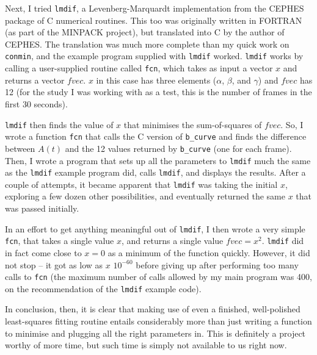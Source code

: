 \documentclass[12pt]{article}
\begin{document}
Next, I tried \verb|lmdif|, a Levenberg-Marquardt implementation from
the CEPHES package of C numerical routines.  This too was originally
written in FORTRAN (as part of the MINPACK project), but translated
into C by the author of CEPHES.  The translation was much more
complete than my quick work on \verb|conmin|, and the example program
supplied with \verb|lmdif| worked.  \verb|lmdif| works by calling
a user-supplied routine called \verb|fcn|, which takes as input a
vector $x$ and returns a vector $fvec$.  $x$ in this case has three
elements ($\alpha$, $\beta$, and $\gamma$) and $fvec$ has 12 (for the
study I was working with as a test, this is the number of frames in
the first 30 seconds).

\verb|lmdif| then finds the value of $x$ that minimises the sum-of-squares of
$fvec$.  So, I wrote a function \verb|fcn| that calls the C version of
\verb|b_curve| and finds the difference between $A(t)$ and the 12 values
returned by \verb|b_curve| (one for each frame).  Then, I wrote a
program that sets up all the parameters to \verb|lmdif| much the same
as the \verb|lmdif| example program did, calls \verb|lmdif|, and
displays the results.  After a couple of attempts, it became apparent
that \verb|lmdif| was taking the initial $x$, exploring a few dozen
other possibilities, and eventually returned the same $x$ that was
passed initially.

In an effort to get anything meaningful out of \verb|lmdif|, I then
wrote a very simple \verb|fcn|, that takes a single value $x$, and
returns a single value $fvec = x^{2}$.  \verb|lmdif| did in fact come
close to $x=0$ as a minimum of the function quickly.  However, it did
not stop -- it got as low as $x$ $10^{-60}$ before giving up after
performing too many calls to \verb|fcn| (the maximum number of calls
allowed by my main program was 400, on the recommendation of the
\verb|lmdif| example code).

In conclusion, then, it is clear that making use of even a finished,
well-polished least-squares fitting routine entails considerably more
than just writing a function to minimise and plugging all the right
parameters in.  This is definitely a project worthy of more time, but
such time is simply not available to us right now.
\end{document}
